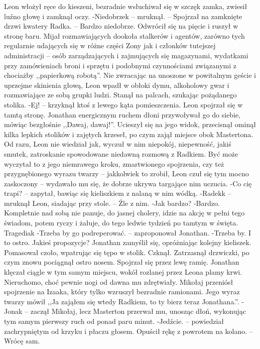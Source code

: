 \documentclass[../MAIN.tex]{subfiles}
\begin{document}
Leon włożył ręce do kieszeni, bezradnie wsłuchiwał się w szczęk zamka, zwiesił luźno głowę i zamknął oczy.
-Niedobrze\3k -- mruknął. -- Spojrzał na zamknięte drzwi kwatery Radka. -- Bardzo niedobrze.
Odwrócił się na pięcie i ruszył w stronę baru. Mijał rozmawiających dookoła stalkerów i agentów, zarówno tych regularnie udających się w różne części Zony jak i członków tutejszej administracji -- osób zarządzających i zajmujących się magazynami, wydatkami przy zamówieniach broni i sprzętu i podobnymi czynnościami związanymi z chociażby ,,papierkową robotą''.
Nie zwracając na unoszone w powitalnym geście i uprzejme skinienia głową, Leon wpadł w obłoki dymu, alkoholowy gwar i rozmawiające ze sobą grupki ludzi. Stanął na palcach, szukając pożądanego stolika.
-Ej! -- krzyknął ktoś z lewego kąta pomieszczenia. Leon spojrzał się w tamtą stronę. Jonathan energicznym ruchem dłoni przywoływał go do siebie, mówiąc bezgłośnie ,,Dawaj, dawaj!''. Ucieszył się na jego widok, przecisnął ominął kilka lepkich stolików i zajętych krzeseł, po czym zajął miejsce obok Mastertona. Od razu, Leon nie wiedział jak, wyczuł w nim niepokój, niepewność, jakiś smutek, zatroskanie spowodowane niedawną rozmową z Radkiem. Być może wyczytał to z jego niemrawego kroku, zmartwionego spojrzenia, czy też przygnębionego wyrazu twarzy -- jakkolwiek to zrobił, Leon czuł się tym mocno zaskoczony -- wydawało mu się, że dobrze ukrywa targające nim uczucia.
-Co cię trapi? -- zapytał, bawiąc się kieliszkiem z nalaną w nim wódką.
-Radek\3k -- mruknął Leon, siadając przy stole. -- Źle z nim.
-Jak bardzo?
-Bardzo. Kompletnie nad sobą nie panuje, do jasnej cholery, idzie na akcję w pełni tego świadom, potem ryczy i żałuje, do tego ledwie tydzień po tamtym w święta. Tragedia\3k
-Trzeba by go podreperować. -- zaproponował Jonathan.
-Trzeba by. I to ostro. Jakieś propozycje?
Jonathan zamyślił się, opróżniając kolejny kieliszek. Pomasował czoło, wpatrując się tępo w stolik. Czknął.
%
%
Zatrzasnął drzwiczki, po czym znowu pociągnął ostro nosem. Spojrzał się przez lewę ramię. Jonathan klęczał ciągle w tym samym miejscu, wokół rozlanej przez Leona plamy krwi. Nieruchomo, choć pewnie nogi od dawna mu zdrętwiały. Mikołaj przeniósł spojrzenie na Izaaka, który tylko wzruszył bezradnie ramionami. Jego wyraz twarzy mówił ,,Ja zająłem się wtedy Radkiem, to ty bierz teraz Jonathana.''.
-Jona\3k -- zaczął Mikołaj, lecz Masterton przerwał mu, unosząc dłoń, wykonując tym samym pierwszy ruch od ponad paru minut.
-Jedźcie. -- powiedział zachrypniętym od krzyku i płaczu głosem. Opuścił rękę z powrotem na kolano. -- Wrócę sam.
\end{document}

